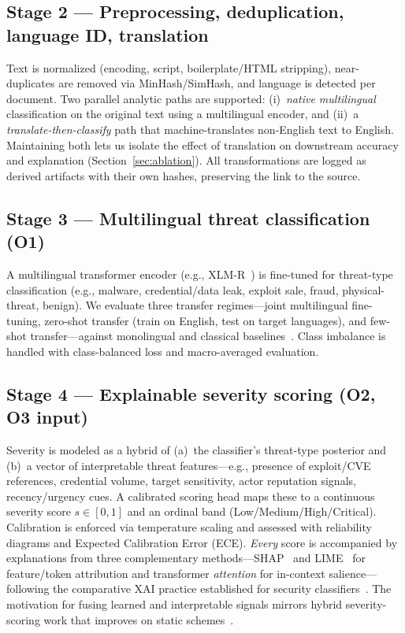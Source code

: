 \documentclass[11pt,a4paper]{article}
\begin{document}
\subsection{Stage 2 --- Preprocessing, deduplication, language ID, translation}
Text is normalized (encoding, script, boilerplate/HTML stripping), near-duplicates are
removed via MinHash/SimHash, and language is detected per document. Two parallel
analytic paths are supported: (i)~\emph{native multilingual} classification on the
original text using a multilingual encoder, and (ii)~a \emph{translate-then-classify}
path that machine-translates non-English text to English. Maintaining both lets us
isolate the effect of translation on downstream accuracy and explanation
(Section~\ref{sec:ablation}). All transformations are logged as derived artifacts with
their own hashes, preserving the link to the source.

\subsection{Stage 3 --- Multilingual threat classification (O1)}
A multilingual transformer encoder (e.g., XLM-R~\cite{conneau2020xlmr}) is fine-tuned
for threat-type classification (e.g., malware, credential/data leak, exploit sale,
fraud, physical-threat, benign). We evaluate three transfer regimes---joint multilingual
fine-tuning, zero-shot transfer (train on English, test on target languages), and
few-shot transfer---against monolingual and classical
baselines~\cite{thangaraj2024crosslingual,alharbi2025bert}. Class imbalance is handled
with class-balanced loss and macro-averaged evaluation.

\subsection{Stage 4 --- Explainable severity scoring (O2, O3 input)}
Severity is modeled as a hybrid of (a)~the classifier's threat-type posterior and
(b)~a vector of interpretable threat features---e.g., presence of exploit/CVE
references, credential volume, target sensitivity, actor reputation signals,
recency/urgency cues. A calibrated scoring head maps these to a continuous severity
score $s\in[0,1]$ and an ordinal band (Low/Medium/High/Critical). Calibration is
enforced via temperature scaling and assessed with reliability diagrams and Expected
Calibration Error (ECE). \emph{Every} score is accompanied by explanations from three
complementary methods---SHAP~\cite{lundberg2017shap} and
LIME~\cite{ribeiro2016lime} for feature/token attribution and transformer
\emph{attention} for in-context salience---following the comparative XAI practice
established for security
classifiers~\cite{hermosilla2025xai,gaspar2024xai,salih2023perspective}. The motivation
for fusing learned and interpretable signals mirrors hybrid severity-scoring work that
improves on static schemes~\cite{zeng2022licality,zeng2024illation,saklani2025severity}.
\end{document}
